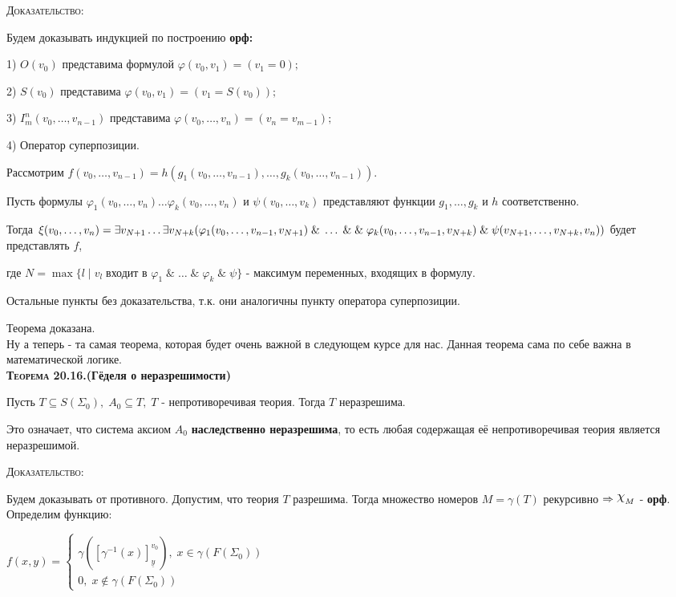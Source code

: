 \documentclass[18pt, a4paper]{extarticle}
\newcommand{\teor}[1]{\textbf{\textsc{Теорема #1}}}
\newcommand{\ampersand}{\;\&\;}
\newcommand{\vp}{\varphi}
\newcommand{\dok}{\textsc{Доказательство:}}
\begin{document}
\dok

Будем доказывать индукцией по построению \textbf{орф:}

1) $O(v_0)$ представима формулой $\vp(v_0,v_1)=(v_1=0);$

2) $S(v_0)$ представима $\vp(v_0,v_1)=(v_1=S(v_0));$

3) $I_m^n(v_0,\dots,v_{n-1})$ представима $\vp(v_0,\dots,v_n)=(v_n=v_{m-1});$

4) Оператор суперпозиции. 

Рассмотрим $f(v_0,\dots,v_{n-1})=h(g_1(v_0,\dots,v_{n-1}),\dots,g_k(v_0,\dots,v_{n-1}))$. 

Пусть формулы $\vp_1(v_0,\dots,v_{n})\dots\vp_k(v_0,\dots,v_{n})$ и $\psi(v_0,\dots,v_k)$ представляют функции $g_1,\dots,g_k$ и $h$ соответственно. 

Тогда $\xi(v_0,\dots,v_n)=\exists v_{N+1}\dots\exists v_{N+k}(\vp_1(v_0,\dots,v_{n-1},v_{N+1})\ampersand\dots\ampersand\newline\ampersand\vp_k(v_0,\dots,v_{n-1},v_{N+k})\ampersand\psi(v_{N+1},\dots,v_{N+k},v_n))$ будет представлять $f$,

где $N=\max\{l\;|\;v_l\;\text{входит в }\vp_1\ampersand\dots\ampersand\vp_k\ampersand\psi\}$ - максимум переменных, входящих в формулу.

Остальные пункты без доказательства, т.к. они аналогичны пункту оператора суперпозиции.

Теорема доказана.\\

Ну а теперь - та самая теорема, которая будет очень важной в следующем курсе для нас. Данная теорема сама по себе важна в математической логике.\\

\teor{20.16.}\textbf{(Гёделя о неразрешимости)} 

Пусть $T\subseteq S(\Sigma_0),\;A_0\subseteq T,\;T$ - непротиворечивая теория. Тогда $T$ неразрешима.

Это означает, что система аксиом $A_0$ \textbf{наследственно неразрешима}, то есть любая содержащая её непротиворечивая теория является неразрешимой.

\dok 

Будем доказывать от противного. Допустим, что теория $T$ разрешима. Тогда множество номеров $M=\gamma(T)$ рекурсивно $\Rightarrow\raisebox{.5ex}{\scalebox{1.2}{$\chi$}}_M$ - \textbf{орф}. Определим функцию:

$f(x,y)=\begin{cases}
   \gamma([\gamma^{-1}(x)]_{\underline{y}}^{v_0}),\;x\in\gamma(F(\Sigma_0))\\
   
   0,\;x\notin\gamma(F(\Sigma_0))
\end{cases}$\\
\end{document}
